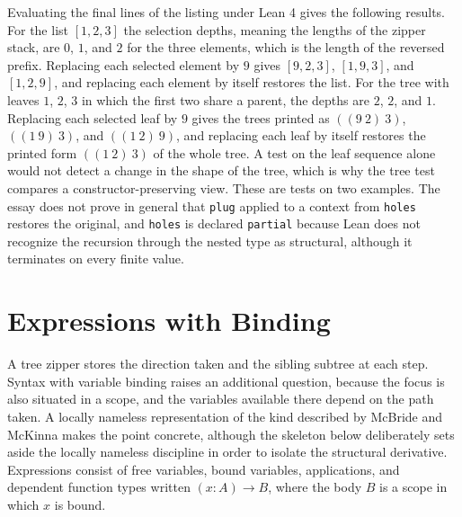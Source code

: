 \documentclass[11pt]{article}
\begin{document}
Evaluating the final lines of the listing under Lean 4 gives the following results. For the list $[1,2,3]$ the selection depths, meaning the lengths of the zipper stack, are $0$, $1$, and $2$ for the three elements, which is the length of the reversed prefix. Replacing each selected element by $9$ gives $[9,2,3]$, $[1,9,3]$, and $[1,2,9]$, and replacing each element by itself restores the list. For the tree with leaves $1$, $2$, $3$ in which the first two share a parent, the depths are $2$, $2$, and $1$. Replacing each selected leaf by $9$ gives the trees printed as $((9\ 2)\ 3)$, $((1\ 9)\ 3)$, and $((1\ 2)\ 9)$, and replacing each leaf by itself restores the printed form $((1\ 2)\ 3)$ of the whole tree. A test on the leaf sequence alone would not detect a change in the shape of the tree, which is why the tree test compares a constructor-preserving view. These are tests on two examples. The essay does not prove in general that \texttt{plug} applied to a context from \texttt{holes} restores the original, and \texttt{holes} is declared \texttt{partial} because Lean does not recognize the recursion through the nested type as structural, although it terminates on every finite value.

\section{Expressions with Binding}

A tree zipper stores the direction taken and the sibling subtree at each step. Syntax with variable binding raises an additional question, because the focus is also situated in a scope, and the variables available there depend on the path taken. A locally nameless representation of the kind described by McBride and McKinna \cite{mcbridemckinna2004} makes the point concrete, although the skeleton below deliberately sets aside the locally nameless discipline in order to isolate the structural derivative. Expressions consist of free variables, bound variables, applications, and dependent function types written $(x{:}A)\to B$, where the body $B$ is a scope in which $x$ is bound.
\end{document}
